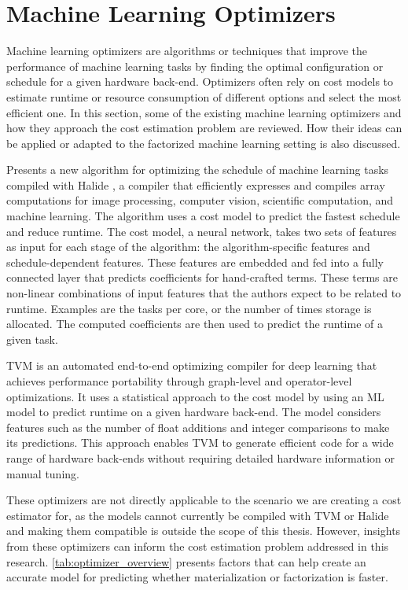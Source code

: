 \section{Machine Learning Optimizers}
\label{sec:3-ml-optimizers}
Machine learning optimizers are algorithms or techniques that improve the performance of machine learning tasks by finding the optimal configuration or schedule for a given hardware back-end. Optimizers often rely on cost models to estimate runtime or resource consumption of different options and select the most efficient one. In this section, some of the existing machine learning optimizers and how they approach the cost estimation problem are reviewed. How their ideas can be applied or adapted to the factorized machine learning setting is also discussed.

\cite{halide_cost_model} Presents a new algorithm for optimizing the schedule of machine learning tasks compiled with Halide \cite{halide}, a compiler that efficiently expresses and compiles array computations for image processing, computer vision, scientific computation, and machine learning. The algorithm uses a cost model to predict the fastest schedule and reduce runtime. The cost model, a neural network, takes two sets of features as input for each stage of the algorithm: the algorithm-specific features and schedule-dependent features. These features are embedded and fed into a fully connected layer that predicts coefficients for hand-crafted terms. These terms are non-linear combinations of input features that the authors expect to be related to runtime. Examples are the tasks per core, or the number of times storage is allocated. The computed coefficients are then used to predict the runtime of a given task.

TVM \cite{tvm} is an automated end-to-end optimizing compiler for deep learning that achieves performance portability through graph-level and operator-level optimizations. It uses a statistical approach to the cost model by using an ML model to predict runtime on a given hardware back-end. The model considers features such as the number of float additions and integer comparisons to make its predictions. This approach enables TVM to generate efficient code for a wide range of hardware back-ends without requiring detailed hardware information or manual tuning.

These optimizers are not directly applicable to the scenario we are creating a cost estimator for, as the models cannot currently be compiled with TVM or Halide and making them compatible is outside the scope of this thesis. However, insights from these optimizers can inform the cost estimation problem addressed in this research. \autoref{tab:optimizer_overview} presents factors that can help create an accurate model for predicting whether materialization or factorization is faster.

